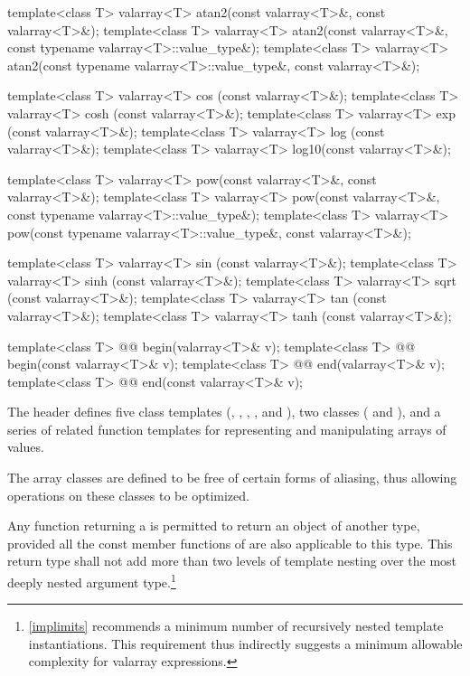\begin{codeblock}
{  template<class T> valarray<T> atan2(const valarray<T>&, const valarray<T>&);
  template<class T> valarray<T> atan2(const valarray<T>&,
                                      const typename valarray<T>::value_type&);
  template<class T> valarray<T> atan2(const typename valarray<T>::value_type&,
                                      const valarray<T>&);

  template<class T> valarray<T> cos  (const valarray<T>&);
  template<class T> valarray<T> cosh (const valarray<T>&);
  template<class T> valarray<T> exp  (const valarray<T>&);
  template<class T> valarray<T> log  (const valarray<T>&);
  template<class T> valarray<T> log10(const valarray<T>&);

  template<class T> valarray<T> pow(const valarray<T>&, const valarray<T>&);
  template<class T> valarray<T> pow(const valarray<T>&, const typename valarray<T>::value_type&);
  template<class T> valarray<T> pow(const typename valarray<T>::value_type&, const valarray<T>&);

  template<class T> valarray<T> sin  (const valarray<T>&);
  template<class T> valarray<T> sinh (const valarray<T>&);
  template<class T> valarray<T> sqrt (const valarray<T>&);
  template<class T> valarray<T> tan  (const valarray<T>&);
  template<class T> valarray<T> tanh (const valarray<T>&);

  template<class T> @@ begin(valarray<T>& v);
  template<class T> @@ begin(const valarray<T>& v);
  template<class T> @@ end(valarray<T>& v);
  template<class T> @@ end(const valarray<T>& v);
}
\end{codeblock}

\pnum
The header
defines five
class templates
(,
,
,
,
and
),
two classes (
and
),
and a series of related
function templates
for representing
and manipulating arrays of values.

\pnum
The
array classes
are defined to be free of certain forms of aliasing, thus allowing
operations on these classes to be optimized.

\pnum
Any function returning a
is permitted to return an object of another type, provided all the
const member functions of
are also applicable to this type.
This return type shall not add
more than two levels of template nesting over the most deeply nested
argument type.\footnote{\ref{implimits} recommends a minimum number
of recursively nested template
instantiations.
This requirement thus indirectly suggests a minimum
allowable complexity for valarray expressions.}

